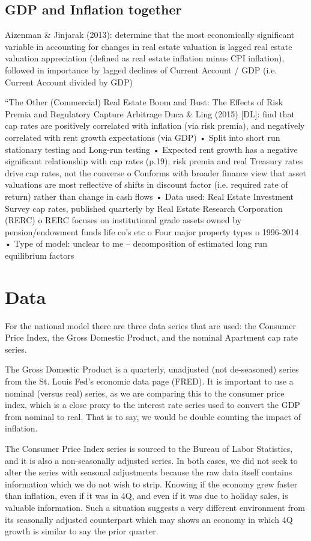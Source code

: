 \subsection{GDP and Inflation together}

Aizenman & Jinjarak (2013): determine that the most economically significant variable in accounting for changes in real estate valuation is lagged real estate valuation appreciation (defined as real estate inflation minus CPI inflation), followed in importance by lagged declines of Current Account / GDP (i.e. Current Account divided by GDP)

“The Other (Commercial) Real Estate Boom and Bust: The Effects of Risk Premia and Regulatory Capture Arbitrage
Duca & Ling (2015) [DL]: find that cap rates are positively correlated with inflation (via risk premia), and negatively correlated with rent growth expectations (via GDP)
•	Split into short run stationary testing and Long-run testing
•	Expected rent growth has a negative significant relationship with cap rates (p.19); risk premia and real Treasury rates drive cap rates, not the converse
o	Conforms with broader finance view that asset valuations are most reflective of shifts in discount factor (i.e. required rate of return) rather than change in cash flows
•	Data used: Real Estate Investment Survey cap rates, published quarterly by Real Estate Research Corporation (RERC)
o	RERC focuses on institutional grade assets owned by pension/endowment funds life co’s etc
o	Four major property types
o	1996-2014
•	Type of model: unclear to me – decomposition of estimated long run equilibrium factors


\section{Data}
For the national model there are three data series that are used: the Consumer Price Index, the Gross Domestic Product, and the nominal Apartment cap rate series. 

The Gross Domestic Product is a quarterly, unadjusted (not de-seasoned) series from the St. Louis Fed's economic data page (FRED). It is important to use a nominal (versus real) series, as we are comparing this to the consumer price index, which is a close proxy to the interest rate series used to convert the GDP from nominal to real. That is to say, we would be double counting the impact of inflation.

The Consumer Price Index series is sourced to the Bureau of Labor Statistics, and it is also a non-seasonally adjusted series. In both cases, we did not seek to alter the series with seasonal adjustments because the raw data itself contains information which we do not wish to strip. Knowing if the economy grew faster than inflation, even if it was in 4Q, and even if it was due to holiday sales, is valuable information. Such a situation suggests a very different environment from its seasonally adjusted counterpart which may shows an economy in which 4Q growth is similar to say the prior quarter.

